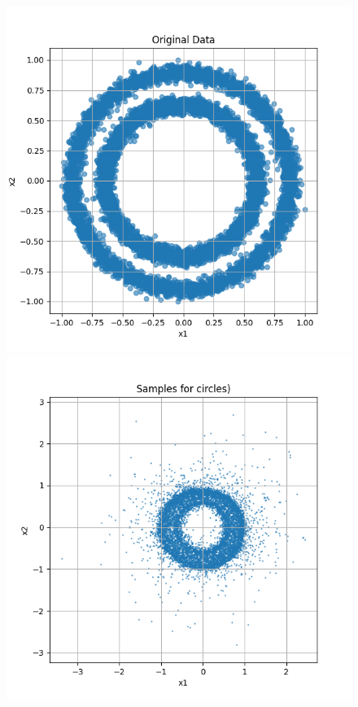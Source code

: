 \documentclass[a4paper,12pt]{article}
\begin{document}
\begin{figure}[H]
  \centering
  \begin{minipage}{0.3\textwidth}
      \centering
      \includegraphics[width=\linewidth]{images/circles.png}
  \end{minipage}
  \begin{minipage}{0.3\textwidth}
      \centering
      \includegraphics[width=\linewidth]{"images/Samples for ddpm_2_10_0.0001_0.02_circles.png"}

\end{minipage}
\end{figure}
\end{document}
